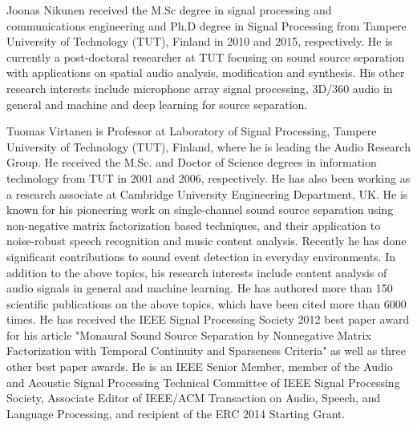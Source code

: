 \documentclass[journal]{IEEEtran}
\begin{document}
\begin{IEEEbiography}{Joonas Nikunen} received the M.Sc degree in signal processing and communications engineering and Ph.D degree in Signal Processing from Tampere University of Technology (TUT), Finland in 2010 and 2015, respectively. He is currently a post-doctoral researcher at TUT focusing on sound source separation with applications on spatial audio analysis, modification and synthesis. His other research interests include microphone array signal processing, 3D/360 audio in general and machine and deep learning for source separation.
\end{IEEEbiography}

\begin{IEEEbiography}{Tuomas Virtanen} is Professor at Laboratory of Signal Processing, Tampere University of Technology (TUT), Finland, where he is leading the Audio Research Group. He received the M.Sc. and Doctor of Science degrees in information technology from TUT in 2001 and 2006, respectively. He has also been working as a research associate at Cambridge University Engineering Department, UK. He is known for his pioneering work on single-channel sound source separation using non-negative matrix factorization based techniques, and their application to noise-robust speech recognition and music content analysis. Recently he has done significant contributions to sound event detection in everyday environments. In addition to the above topics, his research interests include content analysis of audio signals in general and machine learning. He has authored more than 150 scientific publications on the above topics, which have been cited more than 6000 times. He has received the IEEE Signal Processing Society 2012 best paper award for his article "Monaural Sound Source Separation by Nonnegative Matrix Factorization with Temporal Continuity and Sparseness Criteria" as well as three other best paper awards. He is an IEEE Senior Member, member of the Audio and Acoustic Signal Processing Technical Committee of IEEE Signal Processing Society, Associate Editor of IEEE/ACM Transaction on Audio, Speech, and Language Processing, and recipient of the ERC 2014 Starting Grant.
\end{IEEEbiography}
\end{document}
